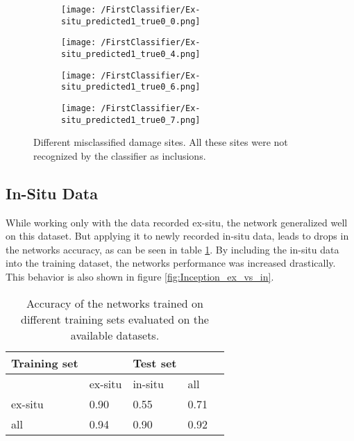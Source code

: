 \begin{figure}
\centering
\begin{subfigure}{.24\textwidth}
\texttt{[image: /FirstClassifier/Ex-situ\_predicted1\_true0\_0.png]}
\caption{}
\label{sub:IncAsRest1}
\end{subfigure}
\centering
\begin{subfigure}{.24\textwidth}
\texttt{[image: /FirstClassifier/Ex-situ\_predicted1\_true0\_4.png]}
\caption{}
\label{sub:IncAsRest2}
\end{subfigure}
\centering
\begin{subfigure}{.24\textwidth}
\texttt{[image: /FirstClassifier/Ex-situ\_predicted1\_true0\_6.png]}
\caption{}
\label{sub:IncAsRest3}
\end{subfigure}
\centering
\begin{subfigure}{.24\textwidth}
\texttt{[image: /FirstClassifier/Ex-situ\_predicted1\_true0\_7.png]}
\caption{}
\label{sub:IncAsRest4}
\end{subfigure}
\caption{Different misclassified damage sites. All these sites were not recognized by the classifier as inclusions.}
\label{fig:InceptionExSituPredictedRestTrueInc}
\end{figure}

\subsection{In-Situ Data}

While working only with the data recorded ex-situ, the network generalized well on this dataset. But applying it to newly recorded in-situ data, leads to drops in the networks accuracy, as can be seen in table \ref{tab:AccuracyComparisonInception}. By including the in-situ data into the training dataset, the networks performance was increased drastically. This behavior is also shown in figure \ref{fig:Inception_ex_vs_in}. \\

\begin{table}[H]
 \begin{center}
  \begin{tabular}{@{} *5l @{}} \toprule[2pt]
   Training set &  &Test set&  \\\midrule
    & ex-situ  & in-situ  & all   \\ 
   ex-situ  & 0.90 & 0.55 & 0.71\\ 
   all  & 0.94 & 0.90 & 0.92\\\bottomrule[2pt]

  \end{tabular}
 \end{center}
 \caption{Accuracy of the networks trained on different training sets evaluated on the available datasets.}
 \label{tab:AccuracyComparisonInception}
\end{table}

